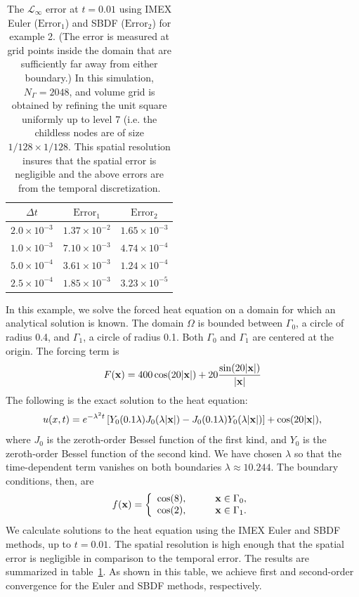 \documentclass[preprint,12pt]{elsarticle}
\newcommand{\x}{{\bf x}}
\newcommand{\tabr}[1]{table~\ref{#1}}
\begin{document}
\begin{table}[htbp]
  \begin{center}
\begin{tabular*}{\textwidth}{@{\extracolsep{\fill}}ccc}
    \hline
  $ \Delta t$ & $\mbox{Error}_1$ & $\mbox{Error}_2$ \\  \hline
    $2.0 \times 10^{-3}$ & $1.37 \times 10^{-2}$ & $1.65 \times 10^{-3}$ \\
    $1.0 \times 10^{-3}$ &  $7.10 \times 10^{-3}$ & $4.74 \times 10^{-4}$ \\
    $5.0 \times 10^{-4}$ & $3.61 \times 10^{-3}$ & $1.24 \times 10^{-4}$ \\
    $2.5 \times 10^{-4}$ & $1.85 \times 10^{-3}$ & $3.23 \times 10^{-5}$ \\
    \hline
  \end{tabular*}
  \end{center}
\caption{The $\mathcal{L}_\infty$ error at $t=0.01$ using IMEX Euler ($\mbox{Error}_1$) and SBDF ($\mbox{Error}_2$) for example 2. (The error is measured at grid points inside the domain that are sufficiently far away from either boundary.) In this simulation, $N_\Gamma = 2048$, and volume grid is obtained by refining the unit square uniformly up to level 7 (i.e. the childless nodes are of size $1/128 \times 1/128$. This spatial resolution insures that the spatial error is negligible and the above errors are from the temporal discretization. 
\label{table3}  }
\end{table}
In this example, we solve the forced heat equation on a domain for which an analytical solution is known. 
The domain $\Omega$ is bounded between $\Gamma_0$,  a circle of radius 0.4, and $\Gamma_1$, a circle of radius 0.1. Both $\Gamma_0$ and $\Gamma_1$ are centered at the origin.
The forcing term is
\[
F(\x) = 400 \cos(20|\x|) + 20 \frac{\sin(20|\x|)}{|\x|}
\]
The following is the exact solution to the heat equation:
\begin{align*}
  u(x,t)=e^{-\lambda^{2}t}\left[Y_{0}(0.1\lambda)J_{0}(\lambda|\x|)-
  J_{0}(0.1\lambda)Y_{0}(\lambda|\x|)\right]+\cos (20 |\x|), 
\end{align*}
where $J_0$ is the zeroth-order Bessel function of the first kind, and $Y_0$ is the zeroth-order Bessel function of the second kind. 
We have chosen $\lambda$ so that the time-dependent term vanishes on both boundaries $\lambda \approx 10.244$. 
The boundary conditions, then, are 
\[
   f(\x) = \left\{ \begin{array}{rl}
                            \cos(8), & \qquad \x \in \Gamma_0, \\
                            \cos(2), & \qquad \x \in \Gamma_1.
                         \end{array} \right.
\]
We calculate solutions to the heat equation using the IMEX Euler and SBDF methods, up to $t = 0.01$. The spatial resolution is high enough that the spatial error is negligible in comparison to the temporal error. The results are summarized in \tabr{table3}. As shown in this table, we achieve first and second-order convergence for the Euler and SBDF methods, respectively. 
\end{document}
